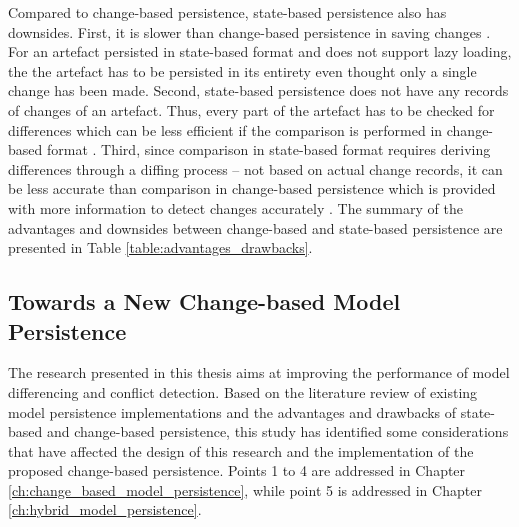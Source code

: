 Compared to change-based persistence, state-based persistence also has  downsides. First, it is slower than change-based persistence in saving changes \cite{mens2002state}. For an artefact persisted in state-based format and does not support lazy loading, the the artefact has to be persisted in its entirety even thought only a single change has been made. Second, state-based persistence does not have any records of changes of an artefact. Thus, every part of the artefact has to be checked for differences which can be less efficient if the comparison is performed in change-based format \cite{DBLP:conf/edoc/KoegelHLHD10}. Third, since comparison in state-based format requires deriving differences through a diffing process -- not based on actual change records, it can be less accurate than comparison in change-based persistence which is provided with more information to detect changes accurately \cite{mens2002state,DBLP:conf/edoc/KoegelHLHD10}. The summary of the advantages and downsides between change-based and state-based persistence are presented in Table \ref{table:advantages_drawbacks}.

\subsection{Towards a New Change-based Model Persistence}
\label{sec:a_new_change_based_persistence}
The research presented in this thesis aims at improving the performance of model differencing and conflict detection. Based on the literature review of existing model persistence implementations and the advantages and drawbacks of state-based and change-based persistence, this study has identified some considerations that have affected the design of this research and the implementation of the proposed change-based persistence. Points 1 to 4 are addressed in Chapter \ref{ch:change_based_model_persistence}, while point 5 is addressed in Chapter \ref{ch:hybrid_model_persistence}.

